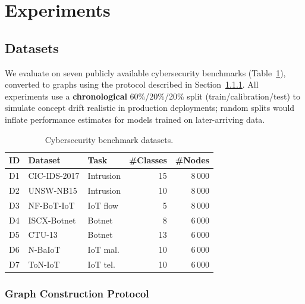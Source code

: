 \section{Experiments}
\label{sec:experiments}

\subsection{Datasets}
\label{sec:datasets}

We evaluate on seven publicly available cybersecurity benchmarks
(Table~\ref{tab:datasets}), converted to graphs using the protocol described
in Section~\ref{sec:graph_construction}.
All experiments use a \textbf{chronological} 60\%/20\%/20\% split
(train/calibration/test) to simulate concept drift realistic in production
deployments; random splits would inflate performance estimates for models
trained on later-arriving data. 

\begin{table}[t]
\caption{Cybersecurity benchmark datasets.}
\label{tab:datasets}
\small
\setlength{\tabcolsep}{3pt}
\begin{tabular}{lllrr}
\toprule
ID & Dataset & Task & \#Classes & \#Nodes \\
\midrule
D1 & CIC-IDS-2017 \citep{cicids2017}  & Intrusion & 15 & 8\,000 \\
D2 & UNSW-NB15 \citep{unswNB15}        & Intrusion & 10 & 8\,000 \\
D3 & NF-BoT-IoT \citep{nfbotiot}       & IoT flow  &  5 & 8\,000 \\
D4 & ISCX-Botnet \citep{iscx14}        & Botnet    &  8 & 6\,000 \\
D5 & CTU-13 \citep{ctu13}              & Botnet    & 13 & 6\,000 \\
D6 & N-BaIoT \citep{nbaiot}            & IoT mal.  & 10 & 6\,000 \\
D7 & ToN-IoT \citep{toniot}            & IoT tel.  & 10 & 6\,000 \\
\bottomrule
\end{tabular}
\end{table}

\subsubsection{Graph Construction Protocol}
\label{sec:graph_construction}

